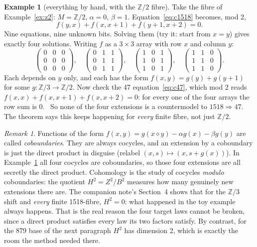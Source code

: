 \documentclass[11pt]{article}
\theoremstyle{definition}\newtheorem{example}{Example}\newtheorem{exercise}{Exercise}
\theoremstyle{remark}\newtheorem*{remark}{Remark}
\newcommand{\op}{\diamond}
\newcommand{\Z}{\mathbb{Z}}
\begin{document}
\begin{example}[everything by hand, with the $\Z/2$ fibre]\label{ex:z2cocycles}
Take the fibre of Example~\ref{ex:z2}: $M=\Z/2$, $\alpha=0$, $\beta=1$. Equation~\eqref{eq:c1518} becomes, mod 2,
\[
f(y,x)+f(x,x+1)+f(y+1,x+2)=0 .
\]
Nine equations, nine unknown bits. Solving them (try it: start from $x=y$) gives exactly four solutions. Writing $f$ as a $3\times3$ array with row $x$ and column $y$:
\[
\begin{pmatrix}0&0&0\\0&0&0\\0&0&0\end{pmatrix},\quad
\begin{pmatrix}0&1&1\\0&1&1\\0&1&1\end{pmatrix},\quad
\begin{pmatrix}1&0&1\\1&0&1\\1&0&1\end{pmatrix},\quad
\begin{pmatrix}1&1&0\\1&1&0\\1&1&0\end{pmatrix}.
\]
Each depends on $y$ only, and each has the form $f(x,y)=g(y)+g(y+1)$ for some $g\colon\Z/3\to\Z/2$. Now check the 47 equation~\eqref{eq:c47}, which mod 2 reads $f(x,x)+f(x,x+1)+f(x,x+2)=0$: for every one of the four arrays the row sum is $0$. \checkmark\ So none of the four extensions is a countermodel to $1518\Rightarrow 47$. The theorem says this keeps happening for \emph{every} finite fibre, not just $\Z/2$.
\end{example}

\begin{remark}
Functions of the form $f(x,y)=g(x\op y)-\alpha g(x)-\beta g(y)$ are called \emph{coboundaries}. They are always cocycles, and an extension by a coboundary is just the direct product in disguise (relabel $(x,s)\mapsto (x,s+g(x))$). In Example~\ref{ex:z2cocycles} all four cocycles are coboundaries, so those four extensions are all secretly the direct product. Cohomology is the study of cocycles \emph{modulo} coboundaries: the quotient $H^{2}=Z^{2}/B^{2}$ measures how many genuinely new extensions there are. The companion note's Section~4 shows that for the $\Z/3$ shift and \emph{every} finite 1518-fibre, $H^{2}=0$: what happened in the toy example always happens. That is the real reason the four target laws cannot be broken, since a direct product satisfies every law its two factors satisfy. By contrast, for the 879 base of the next paragraph $H^{2}$ has dimension 2, which is exactly the room the method needed there.
\end{remark}
\end{document}
